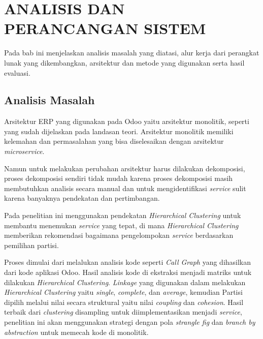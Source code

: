 \chapter{ANALISIS DAN PERANCANGAN SISTEM}
\vspace{4.5pt}

Pada bab ini menjelaskan analisis masalah yang diatasi, alur kerja dari perangkat lunak yang dikembangkan, arsitektur dan metode yang digunakan serta hasil evaluasi.\\

\section{Analisis Masalah}
Arsitektur ERP yang digunakan pada Odoo yaitu arsitektur monolitik, seperti yang sudah dijelaskan pada landasan teori. Arsitektur monolitik memiliki kelemahan dan permasalahan yang bisa diselesaikan dengan arsitektur \textit{microservice}.

Namun untuk melakukan perubahan arsitektur harus dilakukan dekomposisi, proses dekomposisi sendiri tidak mudah karena proses dekomposisi masih membutuhkan analisis secara manual dan untuk mengidentifikasi \textit{service} sulit karena banyaknya pendekatan dan pertimbangan.

Pada penelitian ini menggunakan pendekatan \textit{Hierarchical Clustering} untuk membantu menemukan \textit{service} yang tepat, di mana \textit{Hierarchical Clustering} memberikan rekomendasi bagaimana pengelompokan \textit{service} berdasarkan pemilihan partisi.

Proses dimulai dari melalukan analisis kode seperti \textit{Call Graph} yang dihasilkan dari kode aplikasi Odoo. Hasil analisis kode di ekstraksi menjadi matriks untuk dilakukan \textit{Hierarchical Clustering}. \textit{Linkage} yang digunakan dalam melakukan \textit{Hierarchical Clustering} yaitu \textit{single}, \textit{complete}, dan \textit{average}, kemudian  Partisi  dipilih melalui nilai secara struktural yaitu nilai \textit{coupling}  dan \textit{cohesion}. Hasil terbaik dari \textit{clustering} disampling untuk diimplementasikan menjadi \textit{service}, penelitian ini akan menggunakan strategi dengan pola \textit{strangle fig } dan \textit{branch by abstraction} untuk memecah kode di monolitik.

